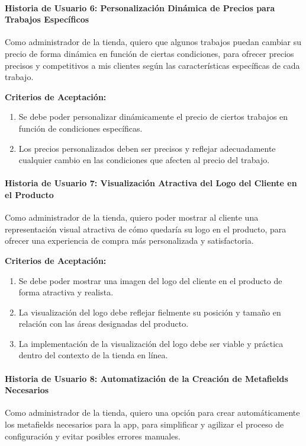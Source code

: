 \documentclass[12pt]{article}
\newcommand{\subsubsubsection}[1]{\paragraph{#1}}
\begin{document}
\subsubsubsection{Historia de Usuario 6: Personalización Dinámica de Precios para Trabajos Específicos}\label{sec:historia6}

Como administrador de la tienda,
quiero que algunos trabajos puedan cambiar su precio de forma dinámica en función de ciertas condiciones,
para ofrecer precios precisos y competitivos a mis clientes según las características específicas de cada trabajo.

\vspace{0.5cm}
\textbf{Criterios de Aceptación:}
\begin{enumerate}[label=\arabic*.]
    \item Se debe poder personalizar dinámicamente el precio de ciertos trabajos en función de condiciones específicas.
    \item Los precios personalizados deben ser precisos y reflejar adecuadamente cualquier cambio en las condiciones que afecten al precio del trabajo.
\end{enumerate}

\subsubsubsection{Historia de Usuario 7: Visualización Atractiva del Logo del Cliente en el Producto}\label{sec:historia7}

Como administrador de la tienda,
quiero poder mostrar al cliente una representación visual atractiva de cómo quedaría su logo en el producto,
para ofrecer una experiencia de compra más personalizada y satisfactoria.

\vspace{0.5cm}
\textbf{Criterios de Aceptación:}
\begin{enumerate}[label=\arabic*.]
    \item Se debe poder mostrar una imagen del logo del cliente en el producto de forma atractiva y realista.
    \item La visualización del logo debe reflejar fielmente su posición y tamaño en relación con las áreas designadas del producto.
    \item La implementación de la visualización del logo debe ser viable y práctica dentro del contexto de la tienda en línea.
\end{enumerate}


\subsubsubsection{Historia de Usuario 8: Automatización de la Creación de Metafields Necesarios}\label{sec:historia8}

Como administrador de la tienda,
quiero una opción para crear automáticamente los metafields necesarios para la app,
para simplificar y agilizar el proceso de configuración y evitar posibles errores manuales.
\end{document}
